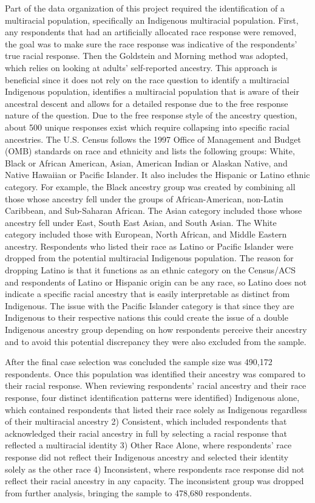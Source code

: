 \documentclass[
  12pt,
  letterpaper,
]{article}
\begin{document}
Part of the data organization of this project required the
identification of a multiracial population, specifically an Indigenous
multiracial population. First, any respondents that had an artificially
allocated race response were removed, the goal was to make sure the race
response was indicative of the respondents' true racial response. Then
the Goldstein and Morning method was adopted, which relies on looking at
adults' self-reported ancestry. This approach is beneficial since it
does not rely on the race question to identify a multiracial Indigenous
population, identifies a multiracial population that is aware of their
ancestral descent and allows for a detailed response due to the free
response nature of the question. Due to the free response style of the
ancestry question, about 500 unique responses exist which require
collapsing into specific racial ancestries. The U.S. Census follows the
1997 Office of Management and Budget (OMB) standards on race and
ethnicity and lists the following groups: White, Black or African
American, Asian, American Indian or Alaskan Native, and Native Hawaiian
or Pacific Islander. It also includes the Hispanic or Latino ethnic
category. For example, the Black ancestry group was created by combining
all those whose ancestry fell under the groups of African-American,
non-Latin Caribbean, and Sub-Saharan African. The Asian category
included those whose ancestry fell under East, South East Asian, and
South Asian. The White category included those with European, North
African, and Middle Eastern ancestry. Respondents who listed their race
as Latino or Pacific Islander were dropped from the potential
multiracial Indigenous population. The reason for dropping Latino is
that it functions as an ethnic category on the Census/ACS and
respondents of Latino or Hispanic origin can be any race, so Latino does
not indicate a specific racial ancestry that is easily interpretable as
distinct from Indigenous. The issue with the Pacific Islander category
is that since they are Indigenous to their respective nations this could
create the issue of a double Indigenous ancestry group depending on how
respondents perceive their ancestry and to avoid this potential
discrepancy they were also excluded from the sample.

After the final case selection was concluded the sample size was 490,172
respondents. Once this population was identified their ancestry was
compared to their racial response. When reviewing respondents' racial
ancestry and their race response, four distinct identification patterns
were identified) Indigenous alone, which contained respondents that
listed their race solely as Indigenous regardless of their multiracial
ancestry 2) Consistent, which included respondents that acknowledged
their racial ancestry in full by selecting a racial response that
reflected a multiracial identity 3) Other Race Alone, where respondents'
race response did not reflect their Indigenous ancestry and selected
their identity solely as the other race 4) Inconsistent, where
respondents race response did not reflect their racial ancestry in any
capacity. The inconsistent group was dropped from further analysis,
bringing the sample to 478,680 respondents.
\end{document}
